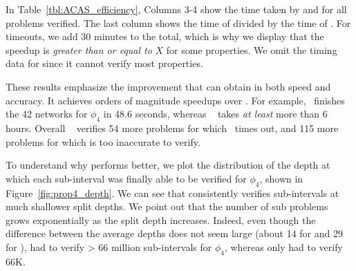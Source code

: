 In Table~\ref{tbl:ACAS_efficiency}, Columns 3-4 show the time taken
by \diffNN{} and \ReluVal{} for all problems verified. The last column
shows the time of \ReluVal{} divided by the time of \diffNN{}.  For
timeouts, we add 30 minutes to the total, which is why we display that the
speedup is \textit{greater than or equal to }$ X $ for some
properties. We omit the timing data for \DeepPoly{} since it cannot
verify most properties.

These results emphasize the improvement that \diffNN{} can obtain in both
speed and accuracy. It achieves orders of magnitude speedups over \ReluVal. For
example, \diffNN~finishes the 42 networks for $ \phi_4 $ in 48.6
seconds, whereas \ReluVal~ takes \textit{at least} more than 6
hours. Overall \diffNN~ verifies 54 more problems for
which \ReluVal~times out, and 115 more problems for which \DeepPoly{}
is too inaccurate to verify.


To understand why \diffNN{} performs better, we plot the distribution
of the depth at which each sub-interval was finally able to be
verified for $ \phi_4 $, shown in Figure~\ref{fig:prop4_depth}. We
can see that \diffNN{} consistently verifies sub-intervals at much
shallower split depths. We point out that the number of sub problems grows
exponentially as the split depth increases. Indeed, even though the
difference between the average depths does not seem large (about 14
for \diffNN{} and 29 for \ReluVal{}), \ReluVal{} had to verify > 66 million
sub-intervals for $ \phi_4 $, whereas \diffNN{} only had to verify
66K.


